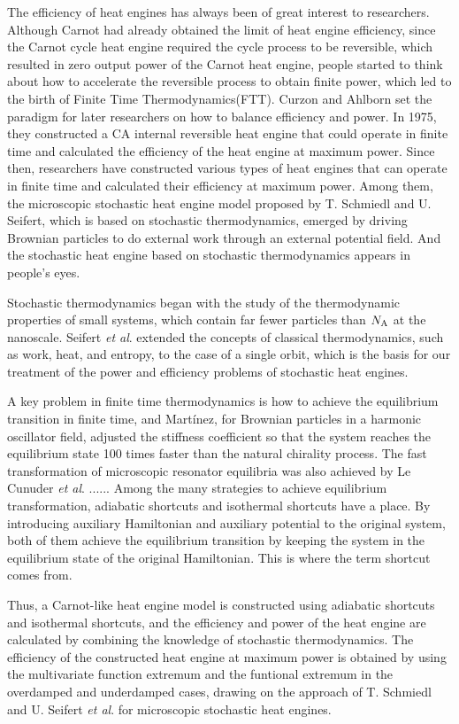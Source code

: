 
\begin{eabstract}
The efficiency of heat engines has always been of great interest to researchers. Although Carnot had already obtained the limit of heat engine efficiency, since the Carnot cycle heat engine required the cycle process to be reversible, which resulted in zero output power of the Carnot heat engine, people started to think about how to accelerate the reversible process to obtain finite power, which led to the birth of Finite Time Thermodynamics(FTT). Curzon and Ahlborn set the paradigm for later researchers on how to balance efficiency and power. In 1975, they constructed a CA internal reversible heat engine that could operate in finite time and calculated the efficiency of the heat engine at maximum power. Since then, researchers have constructed various types of heat engines that can operate in finite time and calculated their efficiency at maximum power. Among them, the microscopic stochastic heat engine model proposed by T. Schmiedl and U. Seifert, which is based on stochastic thermodynamics, emerged by driving Brownian particles to do external work through an external potential field. And the stochastic heat engine based on stochastic thermodynamics appears in people’s eyes.

Stochastic thermodynamics began with the study of the thermodynamic properties of small systems, which contain far fewer particles than $N_{\mathrm{A}}$ at the nanoscale. Seifert \textit{et al}. extended the concepts of classical thermodynamics, such as work, heat, and entropy, to the case of a single orbit, which is the basis for our treatment of the power and efficiency problems of stochastic heat engines. 

A key problem in finite time thermodynamics is how to achieve the equilibrium transition in finite time, and Martínez, for Brownian particles in a harmonic oscillator field, adjusted the stiffness coefficient so that the system reaches the equilibrium state 100 times faster than the natural chirality process. The fast transformation of microscopic resonator equilibria was also achieved by Le Cunuder \textit{et al}. ...... Among the many strategies to achieve equilibrium transformation, adiabatic shortcuts and isothermal shortcuts have a place. By introducing auxiliary Hamiltonian and auxiliary potential to the original system, both of them achieve the equilibrium transition by keeping the system in the equilibrium state of the original Hamiltonian. This is where the term shortcut comes from. 

Thus, a Carnot-like heat engine model is constructed using adiabatic shortcuts and isothermal shortcuts, and the efficiency and power of the heat engine are calculated by combining the knowledge of stochastic thermodynamics. The efficiency of the constructed heat engine at maximum power is obtained by using the multivariate function extremum and the funtional extremum in the overdamped and underdamped cases, drawing on the approach of T. Schmiedl and U. Seifert \textit{et al}. for microscopic stochastic heat engines.
\end{eabstract}

